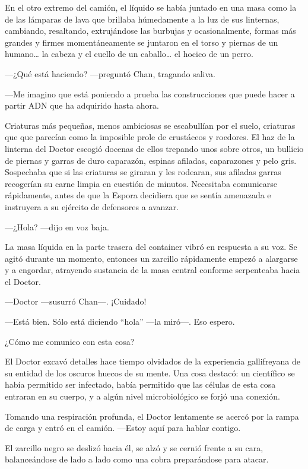 En el otro extremo del camión, el líquido se había juntado en una masa
como la de las lámparas de lava que brillaba húmedamente a la luz de sus
linternas, cambiando, resaltando, extrujándose las burbujas y
ocasionalmente, formas más grandes y firmes momentáneamente se juntaron
en el torso y piernas de un humano\ldots{} la cabeza y el cuello de un
caballo\ldots{} el hocico de un perro.

---¿Qué está haciendo? ---preguntó Chan, tragando saliva.

---Me imagino que está poniendo a prueba las construcciones que puede
hacer a partir ADN que ha adquirido hasta ahora.

Criaturas más pequeñas, menos ambiciosas se escabullían por el suelo,
criaturas que que parecían como la imposible prole de crustáceos y
roedores. El haz de la linterna del Doctor escogió docenas de ellos
trepando unos sobre otros, un bullicio de piernas y garras de duro
caparazón, espinas afiladas, caparazones y pelo gris. Sospechaba que si
las criaturas se giraran y les rodearan, sus afiladas garras recogerían
su carne limpia en cuestión de minutos. Necesitaba comunicarse
rápidamente, antes de que la Espora decidiera que se sentía amenazada e
instruyera a su ejército de defensores a avanzar.

---¿Hola? ---dijo en voz baja.

La masa líquida en la parte trasera del container vibró en respuesta a
su voz. Se agitó durante un momento, entonces un zarcillo rápidamente
empezó a alargarse y a engordar, atrayendo sustancia de la masa central
conforme serpenteaba hacia el Doctor.

---Doctor ---susurró Chan---. ¡Cuidado!

---Está bien. Sólo está diciendo ``hola'' ---la miró---. Eso espero.

¿Cómo me comunico con esta cosa?

El Doctor excavó detalles hace tiempo olvidados de la experiencia
gallifreyana de su entidad de los oscuros huecos de su mente. Una cosa
destacó: un científico se había permitido ser infectado, había permitido
que las células de esta cosa entraran en su cuerpo, y a algún nivel
microbiológico se forjó una conexión.

Tomando una respiración profunda, el Doctor lentamente se acercó por la
rampa de carga y entró en el camión. ---Estoy aquí para hablar contigo.

El zarcillo negro se deslizó hacia él, se alzó y se cernió frente a su
cara, balanceándose de lado a lado como una cobra preparándose para
atacar.

